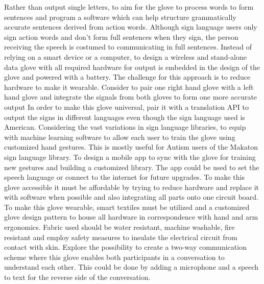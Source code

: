 Rather than output single letters, to aim for the glove to process words to form sentences and program a software which can help structure grammatically accurate sentences derived from action words. Although sign language users only sign action words and don’t form full sentences when they sign, the person receiving the speech is costumed to communicating in full sentences. 
Instead of relying on a smart device or a computer, to design a wireless and stand-alone data glove with all required hardware for output is embedded in the design of the glove and powered with a battery. The challenge for this approach is to reduce hardware to make it wearable. 
Consider to pair one right hand glove with a left hand glove and integrate the signals from both gloves to form one more accurate output
In order to make this glove universal, pair it with a translation API to output the signs in different languages even though the sign language used is American.
Considering the vast variations in sign language libraries, to equip with machine learning software to allow each user to train the glove using customized hand gestures. This is mostly useful for Autism users of the Makaton sign language library. 
To design a mobile app to sync with the glove for training new gestures and building a customized library. The app could be used to set the speech language or connect to the internet for future upgrades.
To make this glove accessible it must be affordable by trying to reduce hardware and replace it with software when possible and also integrating all parts onto one circuit board. 
To make this glove wearable, smart textiles must be utilized and a customized glove design pattern to house all hardware in correspondence with hand and arm ergonomics. Fabric used should be water resistant, machine washable, fire resistant and employ safety measures to insulate the electrical circuit from contact with skin. 
Explore the possibility to create a two-way communication scheme where this glove enables both participants in a conversation to understand each other. This could be done by adding a microphone and a speech to text for the reverse side of the conversation. 